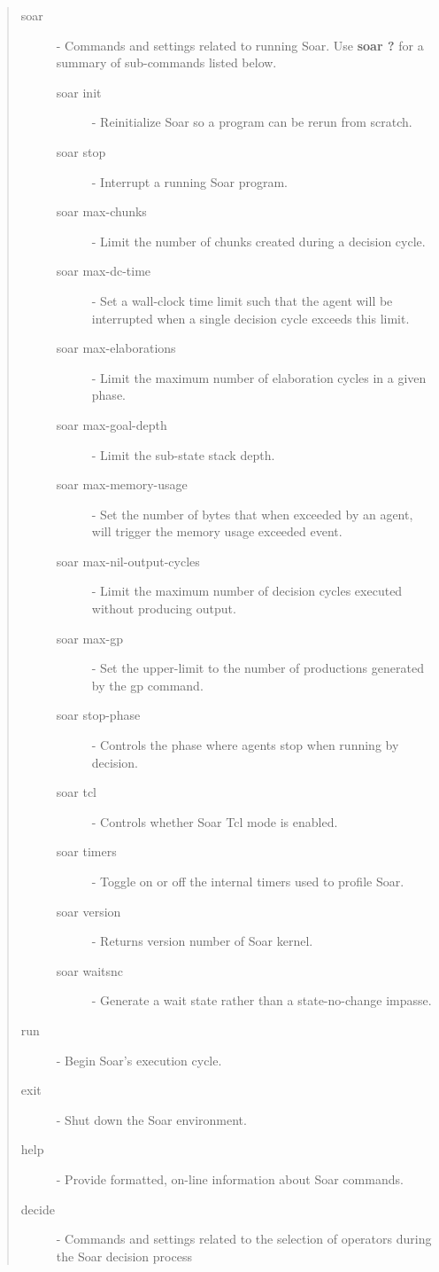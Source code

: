 \begin{quote}
	\begin{description}
		\item[soar] - Commands and settings related to running Soar. Use \textbf{soar ?} for a summary of sub-commands listed below.
		\begin{description}
			\item[soar init] - Reinitialize Soar so a program can be rerun from scratch.
			\item[soar stop] - Interrupt a running Soar program.
			\item[soar max-chunks] - Limit the number of chunks created during a decision cycle.
			\item[soar max-dc-time] - Set a wall-clock time limit such that the agent will be interrupted when a single decision cycle exceeds this limit.
			\item[soar max-elaborations] - Limit the maximum number of elaboration cycles in a given phase.
			\item[soar max-goal-depth] - Limit the sub-state stack depth.
			\item[soar max-memory-usage] - Set the number of bytes that when exceeded by an agent, will trigger the memory usage exceeded event. 
			\item[soar max-nil-output-cycles] - Limit the maximum number of decision cycles executed without producing output. 
			\item[soar max-gp] - Set the upper-limit to the number of productions generated by the gp command.
			\item[soar stop-phase] -  Controls the phase where agents stop when running by decision.
			\item[soar tcl] -  Controls whether Soar Tcl mode is enabled.
			\item[soar timers] - Toggle on or off the internal timers used to profile Soar.
			\item[soar version] - Returns version number of Soar kernel.
			\item[soar waitsnc] - Generate a wait state rather than a state-no-change impasse.
		\end{description}
		\item[run] - Begin Soar's execution cycle.
		\item[exit] - Shut down the Soar environment.
		\item[help] - Provide formatted, on-line information about Soar commands.
		\item[decide ] - Commands and settings related to the selection of operators during the Soar decision process

\end{description}
\end{quote}
